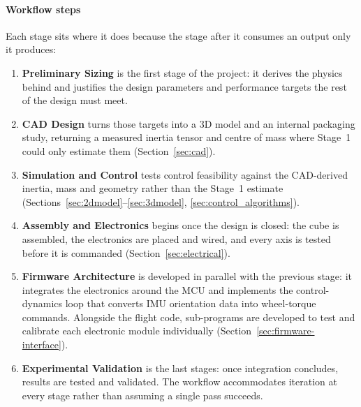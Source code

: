\paragraph{Workflow steps} Each stage sits where it does because the stage
after it consumes an output only it produces:
\begin{enumerate}
\item \textbf{Preliminary Sizing} is the first stage of the project: it derives
  the physics behind \projectname{} and justifies the design parameters and
  performance targets the rest of the design must meet.
\item \textbf{CAD Design} turns those targets into a
  3D model and an internal packaging study, returning a measured inertia
  tensor and centre of mass where Stage~1 could only estimate them (Section~\ref{sec:cad}).
\item \textbf{Simulation and Control} tests control feasibility against the
  CAD-derived inertia, mass and geometry rather than the Stage~1 estimate (Sections~\ref{sec:2dmodel}--\ref{sec:3dmodel},
  \ref{sec:control_algorithms}).
\item \textbf{Assembly and Electronics} begins once the design is closed: the
  cube is assembled, the electronics are placed and wired, and every axis is
  tested before it is commanded (Section~\ref{sec:electrical}).
\item \textbf{Firmware Architecture} is developed in parallel with the
  previous stage: it integrates the electronics around the MCU and implements
  the control-dynamics loop that converts IMU orientation data into
  wheel-torque commands. Alongside the flight code, sub-programs are
  developed to test and calibrate each electronic module individually
  (Section~\ref{sec:firmware-interface}).
\item \textbf{Experimental Validation} is the last stages: once integration
  concludes, results are tested and validated. The workflow accommodates iteration at
  every stage rather than assuming a single pass succeeds.
\end{enumerate}


